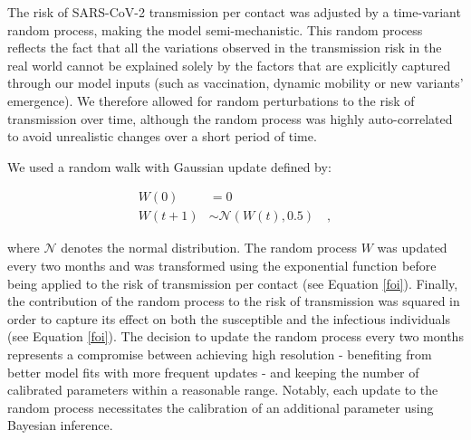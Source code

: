 The risk of SARS-CoV-2 transmission per contact was adjusted by a time-variant random process, making
the model semi-mechanistic. This random process reflects the fact that all the variations observed in the transmission
risk in the real world cannot be explained solely by the factors that are explicitly captured through our model inputs (such as vaccination, dynamic mobility or new variants' emergence).
We therefore allowed for random perturbations to the risk of transmission over time, although the random process was highly auto-correlated
to avoid unrealistic changes over a short period of time.

We used a random walk with Gaussian update defined by:

\begin{equation}
    \label{eq:random_process}
    \begin{split}
    W(0) & = 0 \\
    W(t+1) & \sim \mathcal{N}(W(t), 0.5) \quad ,
    \end{split}
\end{equation}

where $\mathcal{N}$ denotes the normal distribution.
The random process $W$ was updated every two months and was transformed using the exponential function before being applied to the risk of transmission per contact (see Equation \ref{foi}).
Finally, the contribution of the random process to the risk of transmission was squared in order to capture its effect
on both the susceptible and the infectious individuals (see Equation \ref{foi}). 
The decision to update the random process every two months represents a compromise between achieving high 
resolution - benefiting from better model fits with more frequent updates - and keeping the number of calibrated parameters 
within a reasonable range. Notably, each update to the random process necessitates the calibration of an additional parameter using Bayesian inference.